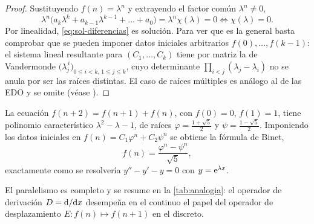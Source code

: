 \begin{proof}
Sustituyendo $f(n)=\lambda^n$ y extrayendo el factor común $\lambda^n\neq0$,
\begin{equation}\label{eq:caracteristico}
  \lambda^n\bigl(a_k\lambda^k+a_{k-1}\lambda^{k-1}+\dots+a_0\bigr)=\lambda^n\chi(\lambda)=0
  \iff \chi(\lambda)=0 .
\end{equation}
Por linealidad, \eqref{eq:sol-diferencias} es solución. Para ver que es la
general basta comprobar que se pueden imponer datos iniciales arbitrarios
$f(0),\dots,f(k-1)$: el sistema lineal resultante para $(C_1,\dots,C_k)$
tiene por matriz la de Vandermonde $\bigl(\lambda_j^{\,i}\bigr)_{0\le i<k,\,1\le j\le k}$,
cuyo determinante $\prod_{i<j}(\lambda_j-\lambda_i)$ no se anula por ser las
raíces distintas. El caso de raíces múltiples es análogo al de las EDO y
se omite (véase \cite[cap.~2]{ELAYDI}).
\end{proof}

\begin{ejemplo}\label{ej:fibonacci}
La ecuación $f(n+2)=f(n+1)+f(n)$, con $f(0)=0$, $f(1)=1$, tiene polinomio
característico $\lambda^2-\lambda-1$, de raíces
$\varphi=\tfrac{1+\sqrt5}{2}$ y $\psi=\tfrac{1-\sqrt5}{2}$. Imponiendo los
datos iniciales en $f(n)=C_1\varphi^n+C_2\psi^n$ se obtiene la fórmula de
Binet,
\[
  f(n)=\frac{\varphi^{n}-\psi^{n}}{\sqrt5},
\]
exactamente como se resolvería $y''-y'-y=0$ con $y=\mathrm{e}^{\lambda x}$.
\end{ejemplo}

El paralelismo es completo y se resume en la \cref{tab:analogia}: el
operador de derivación $D=\mathrm{d}/\mathrm{d} x$ desempeña en el continuo el papel del
operador de desplazamiento $E\colon f(n)\mapsto f(n+1)$ en el discreto.

